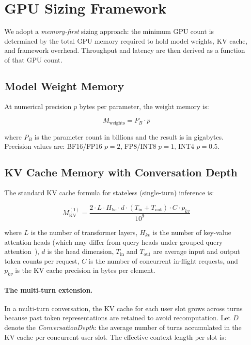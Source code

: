 \documentclass{article}
\begin{document}
\section{GPU Sizing Framework}
\label{sec:sizing}

We adopt a \emph{memory-first} sizing approach: the minimum GPU count is
determined by the total GPU memory required to hold model weights, KV cache,
and framework overhead. Throughput and latency are then derived as a function
of that GPU count.

\subsection{Model Weight Memory}
\label{sec:weights}

At numerical precision $p$ bytes per parameter, the weight memory is:

\begin{equation}
  M_{\text{weights}} = P_B \cdot p
  \label{eq:weights}
\end{equation}

\noindent where $P_B$ is the parameter count in billions and the result is in
gigabytes. Precision values are: BF16/FP16 $p{=}2$, FP8/INT8 $p{=}1$,
INT4 $p{=}0.5$.

\subsection{KV Cache Memory with Conversation Depth}
\label{sec:kvcache}

The standard KV cache formula for stateless (single-turn) inference is:

\begin{equation}
  M_{\text{KV}}^{(1)} = \frac{2 \cdot L \cdot H_{kv} \cdot d \cdot
    (T_{\text{in}} + T_{\text{out}}) \cdot C \cdot p_{kv}}{10^9}
  \label{eq:kv_stateless}
\end{equation}

\noindent where $L$ is the number of transformer layers, $H_{kv}$ is the
number of key-value attention heads (which may differ from query heads under
grouped-query attention~\cite{ainslie2023gqa}), $d$ is the head dimension,
$T_{\text{in}}$ and $T_{\text{out}}$ are average input and output token counts
per request, $C$ is the number of concurrent in-flight requests, and $p_{kv}$
is the KV cache precision in bytes per element.

\paragraph{The multi-turn extension.}
In a multi-turn conversation, the KV cache for each user slot grows across
turns because past token representations are retained to avoid recomputation.
Let $D$ denote the \emph{ConversationDepth}: the average number of turns
accumulated in the KV cache per concurrent user slot.
The effective context length per slot is:
\end{document}
